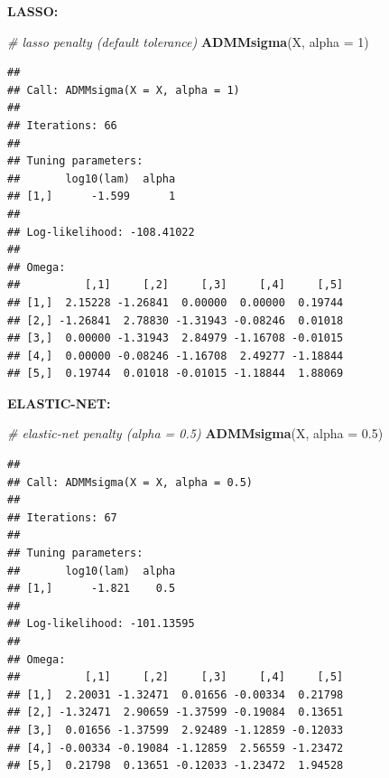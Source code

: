 \documentclass[12pt,]{book}
\newenvironment{Shaded}{\begin{snugshade}}{\end{snugshade}}
\newcommand{\CommentTok}[1]{\textcolor[rgb]{0.56,0.35,0.01}{\textit{#1}}}
\newcommand{\DataTypeTok}[1]{\textcolor[rgb]{0.13,0.29,0.53}{#1}}
\newcommand{\DecValTok}[1]{\textcolor[rgb]{0.00,0.00,0.81}{#1}}
\newcommand{\FloatTok}[1]{\textcolor[rgb]{0.00,0.00,0.81}{#1}}
\newcommand{\KeywordTok}[1]{\textcolor[rgb]{0.13,0.29,0.53}{\textbf{#1}}}
\newcommand{\NormalTok}[1]{#1}
\theoremstyle{definition}
\theoremstyle{definition}
\theoremstyle{definition}
\theoremstyle{remark}
\begin{document}
\vspace{0.5cm}

\textbf{LASSO:}

\vspace{0.5cm}

\begin{Shaded}
\begin{Highlighting}[]
\CommentTok{# lasso penalty (default tolerance)}
\KeywordTok{ADMMsigma}\NormalTok{(X, }\DataTypeTok{alpha =} \DecValTok{1}\NormalTok{)}
\end{Highlighting}
\end{Shaded}

\begin{verbatim}
## 
## Call: ADMMsigma(X = X, alpha = 1)
## 
## Iterations: 66
## 
## Tuning parameters:
##       log10(lam)  alpha
## [1,]      -1.599      1
## 
## Log-likelihood: -108.41022
## 
## Omega:
##          [,1]     [,2]     [,3]     [,4]     [,5]
## [1,]  2.15228 -1.26841  0.00000  0.00000  0.19744
## [2,] -1.26841  2.78830 -1.31943 -0.08246  0.01018
## [3,]  0.00000 -1.31943  2.84979 -1.16708 -0.01015
## [4,]  0.00000 -0.08246 -1.16708  2.49277 -1.18844
## [5,]  0.19744  0.01018 -0.01015 -1.18844  1.88069
\end{verbatim}

\vspace{0.5cm}

\textbf{ELASTIC-NET:}

\vspace{0.5cm}

\begin{Shaded}
\begin{Highlighting}[]
\CommentTok{# elastic-net penalty (alpha = 0.5)}
\KeywordTok{ADMMsigma}\NormalTok{(X, }\DataTypeTok{alpha =} \FloatTok{0.5}\NormalTok{)}
\end{Highlighting}
\end{Shaded}

\begin{verbatim}
## 
## Call: ADMMsigma(X = X, alpha = 0.5)
## 
## Iterations: 67
## 
## Tuning parameters:
##       log10(lam)  alpha
## [1,]      -1.821    0.5
## 
## Log-likelihood: -101.13595
## 
## Omega:
##          [,1]     [,2]     [,3]     [,4]     [,5]
## [1,]  2.20031 -1.32471  0.01656 -0.00334  0.21798
## [2,] -1.32471  2.90659 -1.37599 -0.19084  0.13651
## [3,]  0.01656 -1.37599  2.92489 -1.12859 -0.12033
## [4,] -0.00334 -0.19084 -1.12859  2.56559 -1.23472
## [5,]  0.21798  0.13651 -0.12033 -1.23472  1.94528
\end{verbatim}
\end{document}

